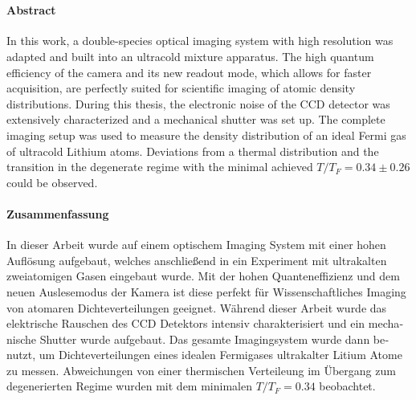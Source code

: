 \cleardoublepage
\thispagestyle{plain}

\makeatletter
\begin{center}
	\large\textbf{\@title}\\
	\normalsize\@author
\end{center}
\makeatother

\paragraph{Abstract}
In this work, a double-species optical imaging system with high resolution was adapted and built into an ultracold mixture apparatus. The high quantum efficiency of the camera and its new readout mode, which allows for faster acquisition, are perfectly suited for scientific imaging of atomic density distributions. During this thesis, the electronic noise of the CCD detector was extensively characterized and a mechanical shutter was set up. The complete imaging setup was used to measure the density distribution of an ideal Fermi gas of ultracold Lithium atoms. Deviations from a thermal distribution and the transition in the degenerate regime with the minimal achieved $T/T_F=0.34\pm0.26$ could be observed.


\begin{otherlanguage}{ngerman}

\paragraph{Zusammenfassung}
In dieser Arbeit wurde auf einem optischem Imaging System mit einer hohen Auflösung aufgebaut, welches anschließend in ein Experiment mit ultrakalten zweiatomigen Gasen eingebaut wurde. Mit der hohen Quanteneffizienz und dem neuen Auslesemodus der Kamera ist diese perfekt für Wissenschaftliches Imaging von atomaren Dichteverteilungen geeignet. Während dieser Arbeit wurde das elektrische Rauschen des CCD Detektors intensiv charakterisiert und ein mechanische Shutter wurde aufgebaut. Das gesamte Imagingsystem wurde dann benutzt, um Dichteverteilungen eines idealen Fermigases ultrakalter Litium Atome zu messen. Abweichungen von einer thermischen Verteileung im Übergang zum degenerierten Regime wurden mit dem minimalen $T/T_F=0.34$ beobachtet.

\end{otherlanguage}
